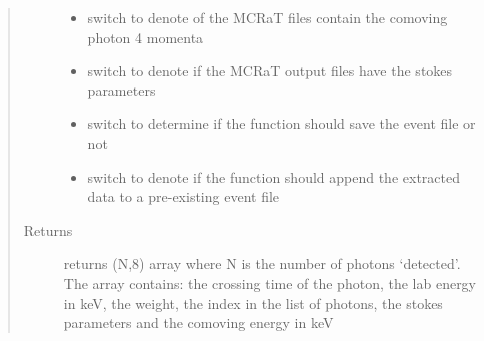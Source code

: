 \documentclass[letterpaper,10pt,english]{sphinxmanual}
\begin{document}
\begin{fulllineitems}
\begin{quote}
\begin{description}
\begin{itemize}
\item {} 
 \textendash{} switch to denote of the MCRaT files contain the comoving photon 4 momenta

\item {} 
 \textendash{} switch to denote if the MCRaT output files have the stokes parameters

\item {} 
 \textendash{} switch to determine if the function should save the event file or not

\item {} 
 \textendash{} switch to denote if the function should append the extracted data to a pre-existing event file

\end{itemize}

\item[{Returns}] \leavevmode
returns (N,8) array where N is the number of photons ‘detected’. The array contains:
the crossing time of the photon, the lab energy in keV, the weight, the index in the list of photons,
the stokes parameters and the comoving energy in keV

\end{description}\end{quote}

\end{fulllineitems}

\end{document}
